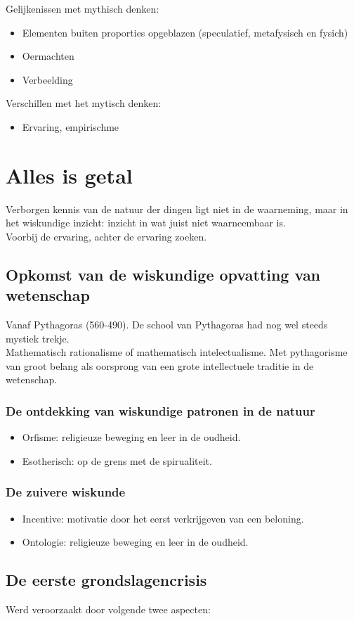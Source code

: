 Gelijkenissen met mythisch denken:
\begin{itemize}
\item Elementen buiten proporties opgeblazen (speculatief, metafysisch en fysich)
\item Oermachten
\item Verbeelding
\end{itemize}
Verschillen met het mytisch denken:
\begin{itemize}
\item Ervaring, empirischme
\end{itemize}
\section{Alles is getal}
Verborgen kennis van de natuur der dingen ligt niet in de waarneming, maar in het wiskundige inzicht: inzicht in wat juist niet waarneembaar is.
\\
Voorbij de ervaring, achter de ervaring zoeken.
\subsection{Opkomst van de wiskundige opvatting van wetenschap}
Vanaf Pythagoras (560-490). De school van Pythagoras had nog wel steeds mystiek trekje.
\\
Mathematisch rationalisme of mathematisch intelectualisme. Met pythagorisme van groot belang als oorsprong van een grote intellectuele traditie in de wetenschap.
\subsubsection{De ontdekking van wiskundige patronen in de natuur}
\begin{itemize}
\item Orfisme: religieuze beweging en leer in de oudheid.
\item Esotherisch: op de grens met de spirualiteit.
\end{itemize}
\subsubsection{De zuivere wiskunde}
\begin{itemize}
\item Incentive: motivatie door het eerst verkrijgeven van een beloning.
\item Ontologie: religieuze beweging en leer in de oudheid.
\end{itemize}
\subsection{De eerste grondslagencrisis}
Werd veroorzaakt door volgende twee aspecten:
